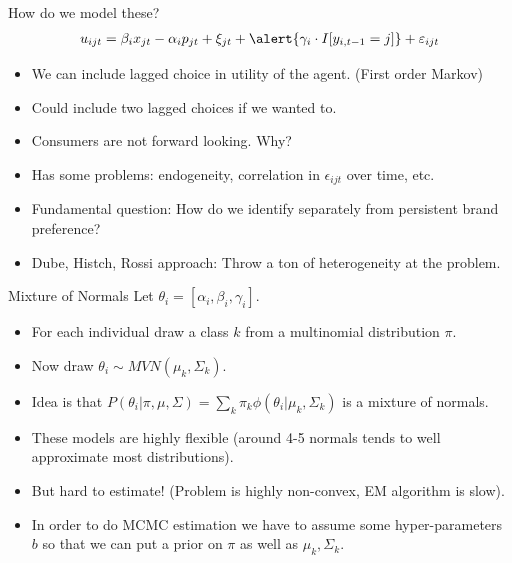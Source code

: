 \documentclass[xcolor=pdftex,dvipsnames,table,mathserif,aspectratio=169]{beamer}
\begin{document}
\begin{frame}{How do we model these?}
\begin{eqnarray*}
u_{ijt} = \beta_i x_{jt} - \alpha_i p_{jt} + \xi_{jt} + \alert{\gamma_i \cdot I[y_{i,t-1}=j]} + \varepsilon_{ijt} 
\end{eqnarray*}
\begin{itemize}
\item We can include \alert{lagged choice} in utility of the agent. (First order Markov)
\item Could include two lagged choices if we wanted to.
\item Consumers are \alert{not} forward looking. Why?
\item Has some problems: endogeneity, correlation in $\epsilon_{ijt}$ over time, etc.
\item Fundamental question: How do we identify separately from persistent brand preference?
\item Dube, Histch, Rossi approach: Throw a ton of heterogeneity at the problem.
\end{itemize}
\end{frame} 

\begin{frame}{Mixture of Normals}
Let $\theta_i =[\alpha_i,\beta_i,\gamma_i]$.
\begin{itemize}
\item For each individual draw a class $k$ from a multinomial distribution $\pi$.
\item Now draw $\theta_i \sim MVN(\mu_k, \Sigma_k)$.
\item Idea is that $P(\theta_i | \pi,\mu,\Sigma) = \sum_k \pi_k \phi(\theta_i | \mu_k, \Sigma_k)$ is a mixture of normals. \pause
\item These models are highly flexible (around 4-5 normals tends to well approximate most distributions).
\item But hard to estimate! (Problem is highly non-convex, EM algorithm is slow).
\item In order to do MCMC estimation we have to assume some hyper-parameters $b$ so that we can put a prior on $\pi$ as well as $\mu_k,\Sigma_k$.
\end{itemize}
\end{frame} 
\end{document}
